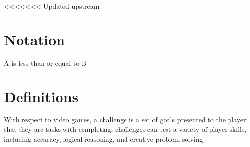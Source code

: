 <<<<<<< Updated upstream

\section*{Notation}
\begin{description}[font=\rmfamily\bfseries, leftmargin=3cm, style=nextline]
	\item[$A \leq B$] A is less than or equal to B
\end{description}

\section*{Definitions}
\begin{description}[font=\rmfamily\bfseries, leftmargin=3cm, style=nextline]
	\item[Challenge] With respect to video games, a challenge is a set of goals presented to the player that they are tasks with completing; challenges can test a variety of player skills, including accuracy, logical reasoning, and creative problem solving
\end{description}

